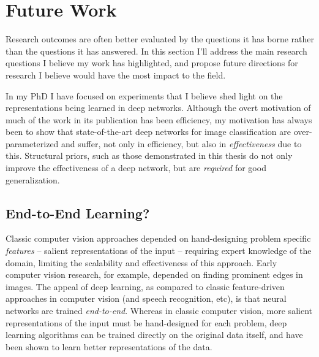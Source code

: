 \documentclass[thesis]{subfiles}
\begin{document}

\chapter{Future Work}  %
\label{futurework}


Research outcomes are often better evaluated by the questions it has borne rather than the questions it has answered. In this section I'll address the main research questions I believe my work has highlighted, and propose future directions for research I believe would have the most impact to the field.

In my PhD I have focused on experiments that I believe shed light on the representations being learned in deep networks. Although the overt motivation of much of the work in its publication has been efficiency, my motivation has always been to show that state-of-the-art deep networks for image classification are over-parameterized and suffer, not only in efficiency, but also in \emph{effectiveness} due to this. Structural priors, such as those demonstrated in this thesis do not only improve the effectiveness of a deep network, but are \emph{required} for good generalization.

\section{End-to-End Learning?}
Classic computer vision approaches depended on hand-designing problem specific \emph{features} -- salient representations of the input -- requiring expert knowledge of the domain, limiting the scalability and effectiveness of this approach. Early computer vision research, for example, depended on finding prominent edges in images. The appeal of deep learning, as compared to classic feature-driven approaches in computer vision (and speech recognition, etc), is that neural networks are trained \emph{end-to-end}. Whereas in classic computer vision, more salient representations of the input must be hand-designed for each problem, deep learning algorithms can be trained directly on the original data itself, and have been shown to learn better representations of the data.
\end{document}
